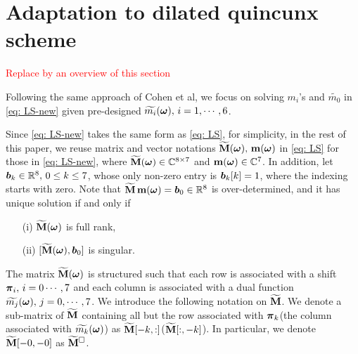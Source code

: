 \section{Adaptation to dilated quincunx scheme}

\textcolor{red}{Replace by an overview of this section}

Following the same approach of Cohen et al, we focus on solving $m_i$'s and $\widetilde{m_0}$ in \eqref{eq: LS-new} given pre-designed $\widetilde{m_{i}}(\boldsymbol{\omega}),\,i=1,\cdots,6$. %

Since \eqref{eq: LS-new} takes the same form as \eqref{eq: LS}, for simplicity, in the rest of this paper, we reuse matrix and vector notations $\widetilde{\mathbf{M}}(\boldsymbol{\omega}),\,\mathbf{m}(\boldsymbol{\omega}) $ in \eqref{eq: LS} for those in \eqref{eq: LS-new}, where $\widetilde{\mathbf{M}}(\boldsymbol{\omega})\in\mathbb{C}^{8\times 7}$ and $\mathbf{m}(\boldsymbol{\omega})\in\mathbb{C}^7$. In addition, let $\boldsymbol{b}_k \in\mathbb{R}^8,\, 0\leq k\leq 7$, whose only non-zero entry is $\boldsymbol{b}_k[k] = 1$, where the indexing starts with zero. Note that $\widetilde{\mathbf{M}}\,\mathbf{m}(\boldsymbol{\omega}) = \boldsymbol{b}_0\in\mathbb{R}^8$ is over-determined, and it has unique solution if and only if 
\begin{itemize}
\item[(i)] $\widetilde{\mathbf{M}}(\boldsymbol{\omega})$ is full rank,
\item[(ii)] $[\widetilde{\mathbf{M}}(\boldsymbol{\omega}), \boldsymbol{b}_0]$ is singular.
\end{itemize}
The matrix $\widetilde{\mathbf{M}}(\boldsymbol{\omega})$ is structured such that each row is associated with a shift $\boldsymbol{\pi}_i,\,i=0\cdots,7$ and each column is associated with a dual function $\widetilde{m_{j}}(\boldsymbol{\omega}),\,j=0,\cdots,7$. We introduce the following notation on $\widetilde{\mathbf{M}}$. We denote a sub-matrix of $\widetilde{\mathbf{M}}$ containing all but the row associated with $\boldsymbol{\pi}_k$(the column associated with $\widetilde{m_{k}}(\boldsymbol{\omega})$) as $\widetilde{\mathbf{M}}[-k,:]$($\widetilde{\mathbf{M}}[:,-k]$).
In particular, we denote $\widetilde{\mathbf{M}}[-0,-0]$ as $\widetilde{\mathbf{M}}^{\Box}$.

